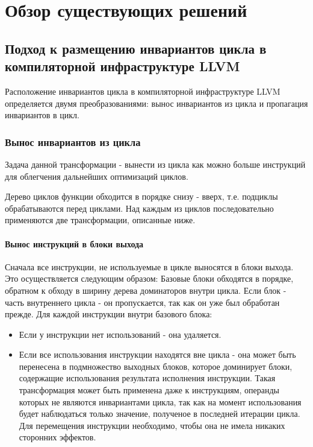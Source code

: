 \chapter{Обзор существующих решений}
\label{sec:Chapter2} 

\section{Подход к размещению инвариантов цикла в компиляторной инфраструктуре LLVM}

Расположение инвариантов цикла в компиляторной инфраструктуре LLVM определяется двумя преобразованиями: вынос инвариантов из цикла и пропагация инвариантов в цикл.

\subsection{Вынос инвариантов из цикла}

Задача данной трансформации - вынести из цикла как можно больше инструкций для облегчения дальнейших оптимизаций циклов.

Дерево циклов функции обходится в порядке снизу - вверх, т.е. подциклы обрабатываются перед циклами.
Над каждым из циклов последовательно применяются две трансформации, описанные ниже.

\subsubsection{Вынос инструкций в блоки выхода}

Сначала все инструкции, не используемые в цикле выносятся в блоки выхода.
Это осуществляется следующим образом:
Базовые блоки обходятся в порядке, обратном к обходу в ширину дерева доминаторов внутри цикла.
Если блок - часть внутреннего цикла - он пропускается, так как он уже был обработан прежде.
Для каждой инструкции внутри базового блока:
\begin{itemize}
    \item Если у инструкции нет использований - она удаляется.
    \item Если все использования инструкции находятся вне цикла - она может быть перенесена в подмножество выходных блоков, которое доминирует блоки, содержащие использования результата исполнения инструкции.
        Такая трансформация может быть применена даже к инструкциям, операнды которых не являются инвариантами цикла, так как на момент использования будет наблюдаться только значение, полученое в последней итерации цикла.
        Для перемещения инструкции необходимо, чтобы она не имела никаких сторонних эффектов.
\end{itemize}

